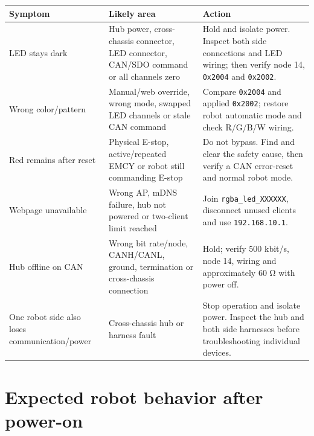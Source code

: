 \documentclass[
  10pt,
  letterpaper,
  openany]{report}
\newcounter{none} %
\begin{document}
{\def\LTcaptype{none} %
\begin{longtable}[]{@{}
  >{\raggedright\arraybackslash}p{}
  >{\raggedright\arraybackslash}p{}
  >{\raggedright\arraybackslash}p{}@{}}
\toprule\noalign{}
\begin{minipage}[b]{\linewidth}\raggedright
Symptom
\end{minipage} & \begin{minipage}[b]{\linewidth}\raggedright
Likely area
\end{minipage} & \begin{minipage}[b]{\linewidth}\raggedright
Action
\end{minipage} \\
\midrule\noalign{}
\endhead
\bottomrule\noalign{}
\endlastfoot
LED stays dark & Hub power, cross-chassis connector, LED connector,
CAN/SDO command or all channels zero & Hold and isolate power. Inspect
both side connections and LED wiring; then verify node 14,
\texttt{0x2004} and \texttt{0x2002}. \\
Wrong color/pattern & Manual/web override, wrong mode, swapped LED
channels or stale CAN command & Compare \texttt{0x2004} and applied
\texttt{0x2002}; restore robot automatic mode and check R/G/B/W
wiring. \\
Red remains after reset & Physical E-stop, active/repeated EMCY or robot
still commanding E-stop & Do not bypass. Find and clear the safety
cause, then verify a CAN error-reset and normal robot mode. \\
Webpage unavailable & Wrong AP, mDNS failure, hub not powered or
two-client limit reached & Join \texttt{rgba\_led\_XXXXXX}, disconnect
unused clients and use \texttt{192.168.10.1}. \\
Hub offline on CAN & Wrong bit rate/node, CANH/CANL, ground, termination
or cross-chassis connection & Hold; verify 500 kbit/s, node 14, wiring
and approximately 60 Ω with power off. \\
One robot side also loses communication/power & Cross-chassis hub or
harness fault & Stop operation and isolate power. Inspect the hub and
both side harnesses before troubleshooting individual devices. \\
\end{longtable}
}

\protect{}\label{robot-startup}
\section{Expected robot behavior after
power-on}\label{expected-robot-behavior-after-power-on}
\end{document}
